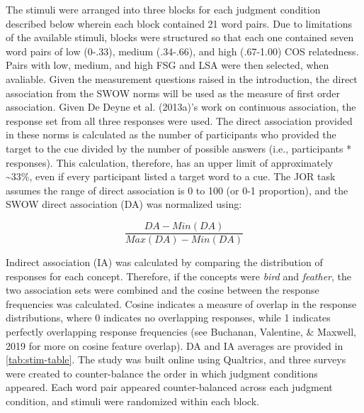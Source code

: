 \documentclass[english,,man]{apa6}
\begin{document}
The stimuli were arranged into three blocks for each judgment condition described below wherein each block contained 21 word pairs. Due to limitations of the available stimuli, blocks were structured so that each one contained seven word pairs of low (0-.33), medium (.34-.66), and high (.67-1.00) COS relatedness. Pairs with low, medium, and high FSG and LSA were then selected, when avaliable. Given the measurement questions raised in the introduction, the direct association from the SWOW norms will be used as the measure of first order association. Given De Deyne et al. (2013a)'s work on continuous association, the response set from all three responses were used. The direct association provided in these norms is calculated as the number of participants who provided the target to the cue divided by the number of possible answers (i.e., participants * responses). This calculation, therefore, has an upper limit of approximately \textasciitilde{}33\%, even if every participant listed a target word to a cue. The JOR task assumes the range of direct association is 0 to 100 (or 0-1 proportion), and the SWOW direct association (DA) was normalized using:

\[\frac{DA - Min(DA)} {Max(DA) - Min(DA)}\]

Indirect association (IA) was calculated by comparing the distribution of responses for each concept. Therefore, if the concepts were \emph{bird} and \emph{feather}, the two association sets were combined and the cosine between the response frequencies was calculated. Cosine indicates a measure of overlap in the response distributions, where 0 indicates no overlapping responses, while 1 indicates perfectly overlapping response frequencies (see Buchanan, Valentine, \& Maxwell, 2019 for more on cosine feature overlap). DA and IA averages are provided in \ref{tab:stim-table}. The study was built online using Qualtrics, and three surveys were created to counter-balance the order in which judgment conditions appeared. Each word pair appeared counter-balanced across each judgment condition, and stimuli were randomized within each block.
\end{document}
